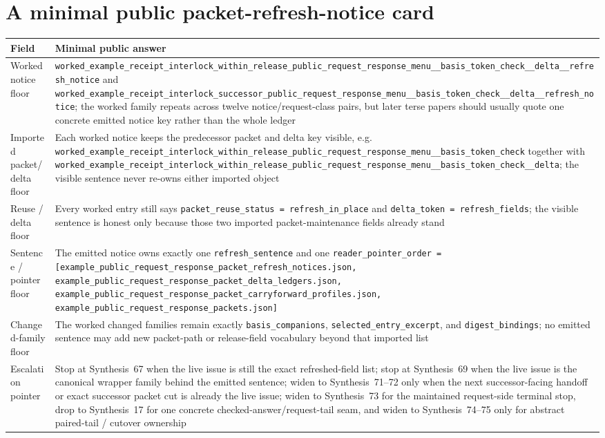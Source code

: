 \documentclass[11pt]{article}
\begin{document}
\section{A minimal public packet-refresh-notice card}
\begin{table}[t]
\centering
\small
\begin{tabularx}{\linewidth}{@{}lX@{}}
\toprule
Field & Minimal public answer \\
\midrule
Worked notice floor & \nolinkurl{worked_example_receipt_interlock_within_release_public_request_response_menu__basis_token_check__delta__refresh_notice} and \nolinkurl{worked_example_receipt_interlock_successor_public_request_response_menu__basis_token_check__delta__refresh_notice}; the worked family repeats across twelve notice/request-class pairs, but later terse papers should usually quote one concrete emitted notice key rather than the whole ledger \\
Imported packet/delta floor & Each worked notice keeps the predecessor packet and delta key visible, e.g. \nolinkurl{worked_example_receipt_interlock_within_release_public_request_response_menu__basis_token_check} together with \nolinkurl{worked_example_receipt_interlock_within_release_public_request_response_menu__basis_token_check__delta}; the visible sentence never re-owns either imported object \\
Reuse / delta floor & Every worked entry still says \nolinkurl{packet_reuse_status = refresh_in_place} and \nolinkurl{delta_token = refresh_fields}; the visible sentence is honest only because those two imported packet-maintenance fields already stand \\
Sentence / pointer floor & The emitted notice owns exactly one \nolinkurl{refresh_sentence} and one \nolinkurl{reader_pointer_order = [example_public_request_response_packet_refresh_notices.json, example_public_request_response_packet_delta_ledgers.json, example_public_request_response_packet_carryforward_profiles.json, example_public_request_response_packets.json]} \\
Changed-family floor & The worked changed families remain exactly \nolinkurl{basis_companions}, \nolinkurl{selected_entry_excerpt}, and \nolinkurl{digest_bindings}; no emitted sentence may add new packet-path or release-field vocabulary beyond that imported list \\
Escalation pointer & Stop at Synthesis~67 when the live issue is still the exact refreshed-field list; stop at Synthesis~69 when the live issue is the canonical wrapper family behind the emitted sentence; widen to Synthesis~71--72 only when the next successor-facing handoff or exact successor packet cut is already the live issue; widen to Synthesis~73 for the maintained request-side terminal stop, drop to Synthesis~17 for one concrete checked-answer/request-tail seam, and widen to Synthesis~74--75 only for abstract paired-tail / cutover ownership \\

\end{tabularx}
\end{table}
\end{document}
